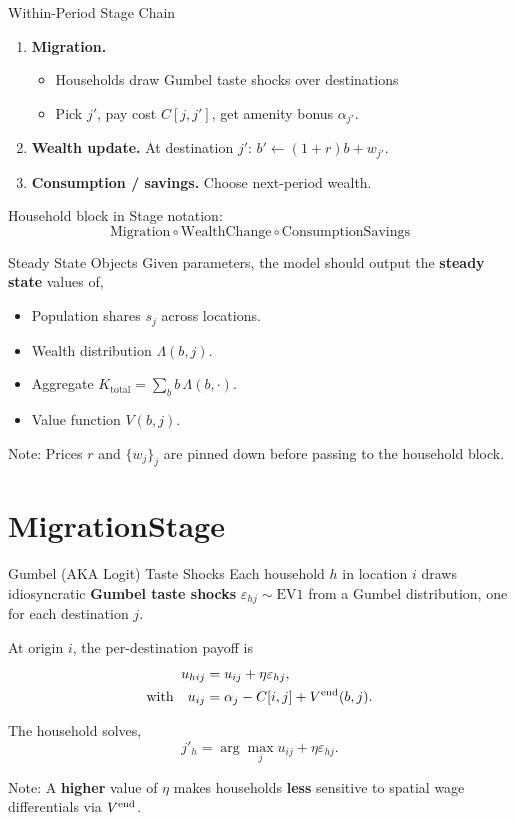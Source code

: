 \documentclass[10pt,aspectratio=169]{beamer}
\begin{document}
\begin{frame}{Within-Period Stage Chain}
  \begin{enumerate}
    \item \textbf{Migration.}
    \begin{itemize}
      \item Households draw Gumbel taste shocks over destinations
      \item Pick $j'$, pay cost $C[j, j']$, get amenity bonus $\alpha_{j'}$.
    \end{itemize}
    \item \textbf{Wealth update.} At destination $j'$: $b' \gets (1 + r) b + w_{j'}$.
    \item \textbf{Consumption / savings.} Choose next-period wealth.
  \end{enumerate}
  Household block in Stage notation:
  \[
    \text{Migration} \circ \text{WealthChange} \circ \text{ConsumptionSavings}
  \]
\end{frame}

\begin{frame}{Steady State Objects}
  Given parameters, the model should output the \textbf{steady state} values of,
  \begin{itemize}
    \item Population shares $s_j$ across locations.
    \item Wealth distribution $\Lambda(b, j)$.
    \item Aggregate $K_{\text{total}} = \sum_b b\, \Lambda(b, \cdot)$.
    \item Value function $V(b, j)$.
  \end{itemize}
  Note: Prices $r$ and $\{w_j\}_j$ are pinned down before passing to the household block.
\end{frame}

\section[MigrationStage]{MigrationStage}

\begin{frame}{Gumbel (AKA Logit) Taste Shocks}
  Each household $h$ in location $i$ draws idiosyncratic \textbf{Gumbel taste shocks} $\varepsilon_{hj} \sim \text{EV1}$ from a Gumbel distribution, one for each destination $j$.

  At origin $i$, the per-destination payoff is
  \begin{align*}
    u_{hij} &= u_{ij} + \eta \varepsilon_{hj},\\
    \text{with}\quad u_{ij} &= \alpha_j -C[i, j] + V^{\mathrm{end}}(b, j).
  \end{align*}

  The household solves,
  \[
    j'_h = \arg\max_j u_{ij} + \eta\varepsilon_{hj}.
  \]

  Note: A \textbf{higher} value of $\eta$ makes households \textbf{less} sensitive to spatial wage differentials via $V^{\mathrm{end}}$.
\end{frame}
\end{document}
